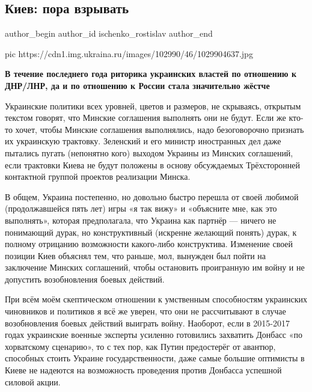  
 
 
 
 
 
\subsection{Киев: пора взрывать}
\label{sec:09_12_2020.news.ru.ukraina_ru.ischenko_rostislav.1.kiev_pora_vzryvat}
\ifcmt
  author_begin
   author_id ischenko_rostislav
  author_end
\fi

\ifcmt
pic https://cdn1.img.ukraina.ru/images/102990/46/1029904637.jpg
\fi

\begin{leftbar}
  \bfseries
В течение последнего года риторика украинских властей по отношению к ДНР/ЛНР,
да и по отношению к России стала значительно жёстче
\end{leftbar}

Украинские политики всех уровней, цветов и размеров, не скрываясь, открытым
текстом говорят, что Минские соглашения выполнять они не будут. Если же кто-то
хочет, чтобы Минские соглашения выполнялись, надо безоговорочно признать их
украинскую трактовку. Зеленский и его министр иностранных дел даже пытались
пугать (непонятно кого) выходом Украины из Минских соглашений, если трактовки
Киева не будут положены в основу обсуждаемых Трёхсторонней контактной группой
проектов реализации Минска.

В общем, Украина постепенно, но довольно быстро перешла от своей любимой
(продолжавшейся пять лет) игры «я так вижу» и «объясните мне, как это
выполнять», которая предполагала, что Украина как партнёр — ничего не
понимающий дурак, но конструктивный (искренне желающий понять) дурак, к полному
отрицанию возможности какого-либо конструктива. Изменение своей позиции Киев
объяснял тем, что раньше, мол, вынужден был пойти на заключение Минских
соглашений, чтобы остановить проигранную им войну и не допустить возобновления
боевых действий.

При всём моём скептическом отношении к умственным способностям украинских
чиновников и политиков я всё же уверен, что они не рассчитывают в случае
возобновления боевых действий выиграть войну. Наоборот, если в 2015-2017 годах
украинские военные эксперты усиленно готовились захватить Донбасс «по
хорватскому сценарию», то с тех пор, как Путин предостерёг от авантюр,
способных стоить Украине государственности, даже самые большие оптимисты в
Киеве не надеются на возможность проведения против Донбасса успешной силовой
акции.

